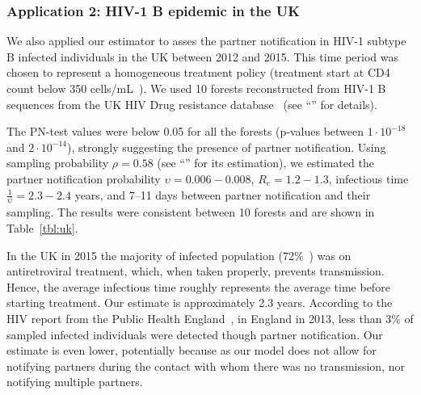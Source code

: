 \documentclass[10pt,letterpaper]{article}
\begin{document}
\subsubsection*{Application 2: HIV-1 B epidemic in the UK}
We also applied our estimator to asses the partner notification in HIV-1 subtype B infected individuals in the UK between 2012 and 2015. This time period was chosen to represent a homogeneous treatment policy  (treatment start at CD4 count below 350 cells/mL~\cite{williamsBritishHIVAssociation2012}). We used 10 forests reconstructed from HIV-1 B sequences from the UK HIV Drug resistance database~\cite{Dunn2007} (see ``'' for details). 

The PN-test values were below 0.05 for all the forests (p-values between $1 \cdot 10^{-18}$ and $2 \cdot 10^{-14}$), strongly suggesting the presence of partner notification. Using sampling probability $\rho=0.58$ (see ``'' for its estimation), we estimated the partner notification probability $\upsilon=0.006-0.008$, %
$R_e = 1.2-1.3$, infectious time $\frac{1}{\psi} = 2.3-2.4$ years, and 7--11 days between partner notification and their sampling. The results were consistent between 10 forests and are shown in Table~\ref{tbl:uk}. %
 
In the UK in 2015 the majority of infected population (72\%~\cite{aHIVUnitedKingdom2016}) was on antiretroviral treatment, which, when taken properly, prevents transmission. Hence, the average infectious time roughly represents the average time before starting treatment. Our estimate is approximately 2.3 years.  According to the HIV report from the Public Health England~\cite{aHIVUnitedKingdom2014}, in England in 2013, less than 3\% of sampled infected individuals were detected though partner notification. Our estimate is even lower, potentially because as our model does not allow for notifying partners during the contact with whom there was no transmission, nor notifying multiple partners.
\end{document}
